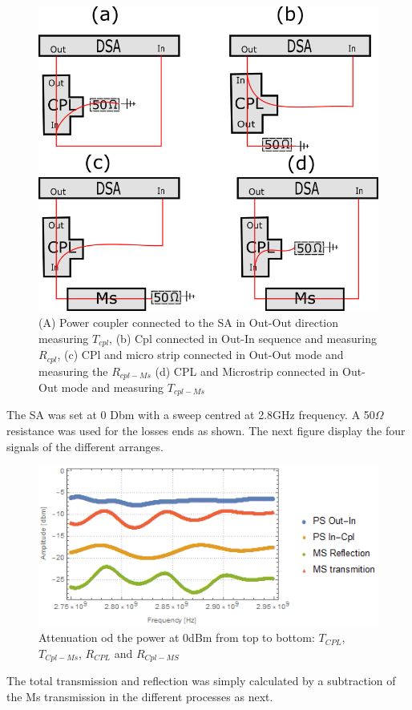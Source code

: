\begin{figure}
	\centering
	\includegraphics[width=0.7\linewidth]{../figures/APD}
	\caption[Diferent arranges of the CPL and MicroStrip conected to the DSA]{(A) Power coupler connected to the SA in Out-Out direction measuring $T_{cpl}$, (b) Cpl connected in Out-In sequence and measuring $R_{cpl}$, (c) CPl and micro strip connected in Out-Out mode and measuring the $R_{cpl-Ms}$ (d) CPL and Microstrip connected in Out-Out mode and measuring $T_{cpl-Ms}$}
	\label{fig:apd}
\end{figure}

The SA was set at 0 Dbm with a sweep centred at 2.8GHz frequency. A 50$\Omega$ resistance was used for the losses ends as shown. The next figure display the four signals of the different arranges.

\begin{figure}
	\centering
	\includegraphics[width=0.7\linewidth]{../figures/microstrip}
	\caption{Attenuation od the power at 0dBm from top to bottom: $T_{CPL}$,$T_{Cpl-Ms}$, $R_{CPL}$ and $R_{Cpl-MS}$}
	\label{fig:microstrip}
	\end{figure}

The total transmission and reflection was simply calculated by a subtraction of the Ms transmission in the different processes as next.

